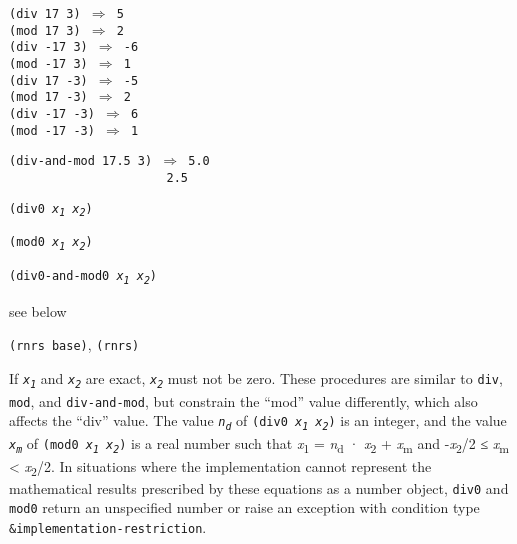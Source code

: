 \begin{alltt}
(div 17 3) \(\Rightarrow\) 5
(mod 17 3) \(\Rightarrow\) 2
(div -17 3) \(\Rightarrow\) -6
(mod -17 3) \(\Rightarrow\) 1
(div 17 -3) \(\Rightarrow\) -5
(mod 17 -3) \(\Rightarrow\) 2
(div -17 -3) \(\Rightarrow\) 6
(mod -17 -3) \(\Rightarrow\) 1

(div-and-mod 17.5 3) \(\Rightarrow\) 5.0
                      2.5
\end{alltt}

\begin{description}

\label{objects_s100}\item[procedure] \texttt{(div0 \textit{x\textsubscript{1}} \textit{x\textsubscript{2}})}



\item[procedure] \texttt{(mod0 \textit{x\textsubscript{1}} \textit{x\textsubscript{2}})}



\item[procedure] \texttt{(div0-and-mod0 \textit{x\textsubscript{1}} \textit{x\textsubscript{2}})}



\item[returns] see below


\item[libraries] \texttt{(rnrs base)}, \texttt{(rnrs)}
\end{description}


If \texttt{\textit{x\textsubscript{1}}} and \texttt{\textit{x\textsubscript{2}}} are exact, \texttt{\textit{x\textsubscript{2}}} must not be zero.
These procedures are similar to \texttt{div}, \texttt{mod}, and
\texttt{div-and-mod}, but constrain the ``mod'' value differently,
which also affects the ``div'' value.
The value \texttt{\textit{n\textsubscript{d}}} of \texttt{(div0 \textit{x\textsubscript{1}} \textit{x\textsubscript{2}})} is an integer,
and the value \texttt{\textit{x\textsubscript{m}}} of \texttt{(mod0 \textit{x\textsubscript{1}} \textit{x\textsubscript{2}})} is a real
number such that \textit{x}\textsubscript{1} = \textit{n}\textsubscript{d} · \textit{x}\textsubscript{2} + \textit{x}\textsubscript{m} and
-\textbar{}\textit{x}\textsubscript{2}/2\textbar{} ≤ \textit{x}\textsubscript{m} \textless{} \textbar{}\textit{x}\textsubscript{2}/2\textbar{}.
In situations where the implementation cannot represent the mathematical
results prescribed by these equations as a number object, \texttt{div0} and
\texttt{mod0} return an unspecified number or raise an exception with
condition type \texttt{\&{}implementation-restriction}.


